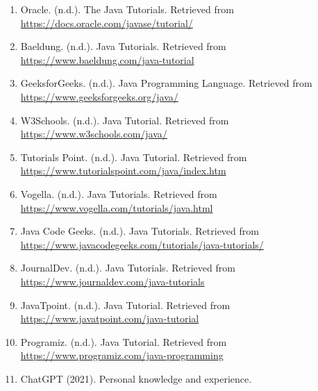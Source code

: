 \documentclass{article}
\begin{document}
\begin{enumerate}
        \item Oracle. (n.d.). The Java\texttrademark{} Tutorials. Retrieved from \url{https://docs.oracle.com/javase/tutorial/}
        \item Baeldung. (n.d.). Java Tutorials. Retrieved from \url{https://www.baeldung.com/java-tutorial}
        \item GeeksforGeeks. (n.d.). Java Programming Language. Retrieved from \url{https://www.geeksforgeeks.org/java/}
        \item W3Schools. (n.d.). Java Tutorial. Retrieved from \url{https://www.w3schools.com/java/}
        \item Tutorials Point. (n.d.). Java Tutorial. Retrieved from \url{https://www.tutorialspoint.com/java/index.htm}
        \item Vogella. (n.d.). Java Tutorials. Retrieved from \url{https://www.vogella.com/tutorials/java.html}
        \item Java Code Geeks. (n.d.). Java Tutorials. Retrieved from \url{https://www.javacodegeeks.com/tutorials/java-tutorials/}
        \item JournalDev. (n.d.). Java Tutorials. Retrieved from \url{https://www.journaldev.com/java-tutorials}
        \item JavaTpoint. (n.d.). Java Tutorial. Retrieved from \url{https://www.javatpoint.com/java-tutorial}
        \item Programiz. (n.d.). Java Tutorial. Retrieved from \url{https://www.programiz.com/java-programming}
        \item ChatGPT (2021). Personal knowledge and experience.
\end{enumerate}
\end{document}
